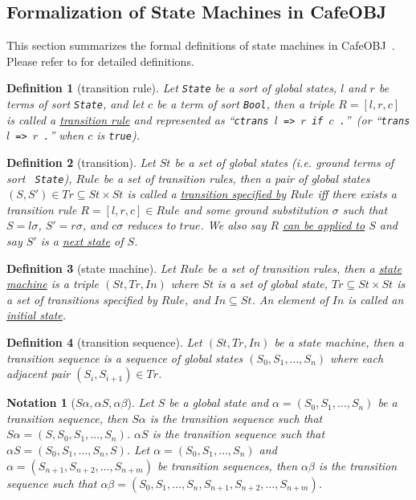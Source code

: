 \documentclass[12pt]{report}
\newtheorem{notation}{Notation}
\newtheorem{definition}{Definition}
\newcommand{\stt}[1]{{\small{\tt {#1}}}}
\newcommand{\ul}{\underline}
\newcommand{\cafeobj}{{\sf CafeOBJ}~}
\begin{document}
\subsection{Formalization of State Machines in \cafeobj}
\label{sec:statemachine}
This section summarizes the formal definitions of state machines in
\cafeobj. Please refer to \cite{Futatsugi15} for detailed
definitions.
\begin{definition}[transition rule]
  Let {\tt State} be a sort of global states, $l$ and $r$ be terms of
  sort {\tt State}, and let $c$ be a term of sort {\tt Bool}, then a
  triple $R = [l,r,c]$ is called a \ul{transition rule} and
  represented as ``\stt{ctrans $l$ => $r$ if $c$ .}''~(or ``\stt{trans
    $l$ => $r$ .}'' when $c$ is \stt{true}).
\end{definition}
\begin{definition}[transition]
  Let $St$ be a set of global states (i.e. ground terms of sort {\tt
    State}), $Rule$ be a set of transition rules, then a pair of
  global states $(S,S')\in Tr\subseteq St\times St$ is called a
  \ul{transition specified by} $Rule$ iff there exists a transition
  rule $R=[l,r,c]\in Rule$ and some ground substitution $\sigma$ such
  that $S=l\sigma$, $S'=r\sigma$, and $c\sigma$ reduces to $true$. We
  also say $R$ \ul{can be applied to} $S$ and say $S'$ is a \ul{next
    state} of $S$.
\end{definition}
\begin{definition}[state machine]
  Let $Rule$ be a set of transition rules, then a \ul{state machine}
  is a triple $(St,Tr,In)$ where $St$ is a set of global state,
  $Tr\subseteq St\times St$ is a set of transitions specified by
  $Rule$, and $In \subseteq St$. An element of $In$ is called an
  \ul{initial state}.
\end{definition}
\begin{definition}[transition sequence]
  Let $(St,Tr,In)$ be a state machine, then a transition sequence is a
  sequence of global states $(S_0,S_1,\dots,S_n)$ where each adjacent
  pair $(S_i,S_{i+1}) \in Tr$. 
\end{definition}
\begin{notation}[$S\alpha,\alpha S,\alpha\beta$]
  Let $S$ be a global state and $\alpha=(S_0,S_1,\dots,S_n)$ be a
  transition sequence, then \ul{$S\alpha$} is the transition sequence
  such that $S\alpha=(S,S_0,S_1,\dots,S_n)$.  \ul{$\alpha S$} is the
  transition sequence such that $\alpha S=(S_0,S_1,\dots,S_n,S)$.  Let
  $\alpha=(S_0,S_1,\dots,S_n)$ and
  $\alpha=(S_{n+1},S_{n+2},\dots,S_{n+m})$ be transition sequences,
  then \ul{$\alpha\beta$} is the transition sequence such that
  $\alpha\beta=(S_0,S_1,\dots,S_n,S_{n+1},S_{n+2},\dots,S_{n+m})$.
\end{notation}
\end{document}
